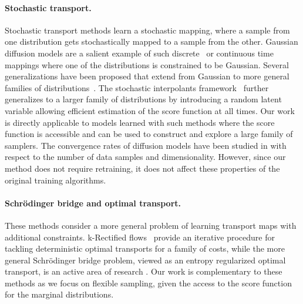 \paragraph{Stochastic transport.}
Stochastic transport methods learn a stochastic mapping, where a sample from one distribution gets stochastically mapped to a sample from the other.
Gaussian diffusion models are a salient example of such discrete~\cite{sohl2015deep,ho2020denoising} or continuous time~\cite{song2020score,kingma2021variational} mappings where one of the distributions is constrained to be Gaussian.
Several generalizations have been proposed that extend from Gaussian to more general families of distributions~\cite{yoon2024score}.
The stochastic interpolants framework~\citep{albergo2022building,albergo2023stochastic,ma2024sit} further generalizes to a larger family of distributions by introducing a random latent variable allowing efficient estimation of the score function at all times.
Our work is directly applicable to models learned with such methods where the score function is accessible and can be used to construct and explore a large family of samplers.
The convergence rates of diffusion models have been studied in \cite{chen2023score,benton2023linear} with respect to the number of data samples and dimensionality.
However, since our method does not require retraining, it does not affect these properties of the original training algorithms.

\paragraph{Schr\"odinger bridge and optimal transport.}
These methods consider a more general problem of learning transport maps with additional constraints.
k-Rectified flows~\cite{liu2022flow} provide an iterative procedure for tackling deterministic optimal transports for a family of costs, while the more general Schr\"odinger bridge problem, viewed as an entropy regularized optimal transport, is an active area of research \cite{shi2024diffusion,liu2023i2sb}.
Our work is complementary to these methods as we focus on flexible sampling, given the access to the score function for the marginal distributions.
